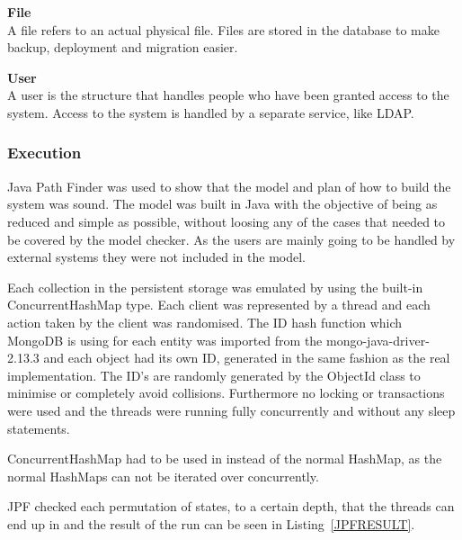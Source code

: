 \documentclass[a4paper,12pt]{article}
\begin{document}
\par \textbf{File} \\
A file refers to an actual physical file. Files are stored in the database to make backup,
deployment and migration easier.\\

\par \textbf{User} \\
A user is the structure that handles people who have been granted access to the system. Access to
the system is handled by a separate service, like LDAP.\\

\subsubsection{Execution}
Java Path Finder was used to show that the model and plan of how to build the system was sound. The
model was built in Java with the objective of being as reduced and simple as possible, without
loosing any of the cases that needed to be covered by the model checker. As the users are mainly
going to be handled by external systems they were not included in the model.

Each collection in the persistent storage was emulated by using the built-in ConcurrentHashMap type.
Each client was represented by a thread and each action taken by the client was randomised. The ID
hash function which MongoDB is using for each entity was imported from the mongo-java-driver-2.13.3
and each object had its own ID, generated in the same fashion as the real implementation. The ID's
are randomly generated by the ObjectId class to minimise or completely avoid collisions.
Furthermore no locking or transactions were used and the threads were running fully concurrently and
without any sleep statements. 

ConcurrentHashMap had to be used in instead of the normal HashMap, as the normal HashMaps can not 
be iterated over concurrently.

JPF checked each permutation of states, to a certain depth, that the threads can end up in and the 
result of the run can be seen in Listing~\ref{JPFRESULT}.
\end{document}
